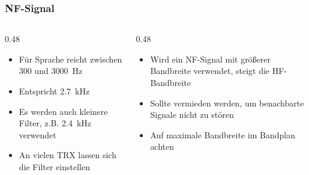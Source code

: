 \begin{frame}
\end{frame}

\begin{frame}
\frametitle{NF-Signal}
\begin{columns}
    \begin{column}{0.48\textwidth}
    \begin{itemize}
  \item Für Sprache reicht zwischen 300 und \qty{3000}{\hertz}
  \item Entspricht \qty{2,7}{\kilo\hertz}
  \item Es werden auch kleinere Filter, z.B. \qty{2,4}{\kilo\hertz} verwendet
  \item An vielen TRX lassen sich die Filter einstellen
  \end{itemize}

    \end{column}
   \begin{column}{0.48\textwidth}
       \begin{itemize}
  \item Wird ein NF-Signal mit größerer Bandbreite verwendet, steigt die HF-Bandbreite
  \item Sollte vermieden werden, um benachbarte Signale nicht zu stören
  \item Auf maximale Bandbreite im Bandplan achten
  \end{itemize}

   \end{column}
\end{columns}

\end{frame}

